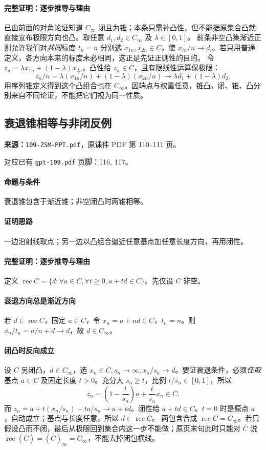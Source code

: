 \paragraph{完整证明：逐步推导与理由}

已由前面的对角论证知道 $C_\infty$ 闭且为锥；本条只需补凸性，但不能据原集合凸就直接宣布极限方向也凸。取任意 $d_1,d_2\in C_\infty$ 及 $\lambda\in[0,1]$。
前条非空凸集渐近正则允许我们对\emph{共同}标度 $t_n=n$ 分别选 $x_{1n},x_{2n}\in C$，使 $x_{in}/n\to d_i$。若只用普通定义，各方向本来的标度未必相同，这正是先证正则性的目的。
令 $z_n=\lambda x_{1n}+(1-\lambda)x_{2n}$。凸性给 $z_n\in C$，且有限线性运算保极限：
\[z_n/n=\lambda(x_{1n}/n)+(1-\lambda)(x_{2n}/n)\to\lambda d_1+(1-\lambda)d_2.\]
用序列锥定义得到这个凸组合也在 $C_\infty$。因端点与权重任意，锥凸。闭、锥、凸分别来自不同论证，不能把它们视为同一性质。

\clearpage\subsection{衰退锥相等与非闭反例}
\textbf{来源：}\texttt{109-ZSM-PPT.pdf}，原课件 PDF 第 110--111 页。\par
对应已有 \texttt{gpt-109.pdf} 页脚：116, 117。\par
\paragraph{命题与条件}衰退锥包含于渐近锥；非空闭凸时两锥相等。
\paragraph{证明思路}一边沿射线取点；另一边以凸组合逼近任意基点加任意长度方向，再用闭性。
\paragraph{完整证明：逐步推导与理由}

定义 $\operatorname{rec}C=\{d:\forall a\in C,\forall t\ge0,a+td\in C\}$。先仅设 $C$ 非空。
\paragraph{衰退方向总是渐近方向}
若 $d\in\operatorname{rec}C$，固定 $a\in C$，令 $x_n=a+nd\in C$，$t_n=n$。则 $x_n/t_n=a/n+d\to d$，故 $d\in C_\infty$。
\paragraph{闭凸时反向成立}
设 $C$ 另闭凸，$d\in C_\infty$，选 $x_n\in C,s_n\to\infty,x_n/s_n\to d$。要证衰退条件，必须\emph{任取}基点 $a\in C$ 及固定长度 $t>0$。充分大 $s_n\ge t$，比例 $t/s_n\in[0,1]$，所以
\[z_n=\left(1-\frac t{s_n}\right)a+\frac t{s_n}x_n\in C.\]
而 $z_n=a+t(x_n/s_n)-ta/s_n\to a+td$。闭性给 $a+td\in C$。$t=0$ 时是原点 $a$，自动成立；基点与长度任意，所以 $d\in\operatorname{rec}C$。
两包含合成 $\operatorname{rec}C=C_\infty$。若只假设凸而不闭，最后从极限回到集合内这一步不能做；原页末句此时只能对 $\overline C$ 说 $\operatorname{rec}(\overline C)=(\overline C)_\infty=C_\infty$，不能去掉闭包横线。

